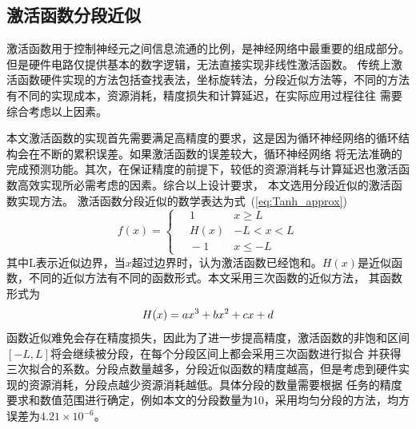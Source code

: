 \subsection{激活函数分段近似}

激活函数用于控制神经元之间信息流通的比例，是神经网络中最重要的组成部分。但是硬件电路仅提供基本的数字逻辑，无法直接实现非线性激活函数。
传统上激活函数硬件实现的方法包括查找表法，坐标旋转法，分段近似方法等，不同的方法有不同的实现成本，资源消耗，精度损失和计算延迟，在实际应用过程往往
需要综合考虑以上因素。

本文激活函数的实现首先需要满足高精度的要求，这是因为循环神经网络的循环结构会在不断的累积误差。如果激活函数的误差较大，循环神经网络
将无法准确的完成预测功能。其次，在保证精度的前提下，较低的资源消耗与计算延迟也激活函数高效实现所必需考虑的因素。综合以上设计要求，
本文选用分段近似的激活函数实现方法。
激活函数分段近似的数学表达为式~(\ref{eq:Tanh_approx})
\begin{equation}
f(x) = 
  \begin{cases} 
  \quad 1			&  x \geq L \\
  \quad H(x)     	&  -L < x < L	\\
  \quad -1			& 	x\leq -L
  \end{cases}
\label{eq:Tanh_approx}
\end{equation}
其中L表示近似边界，当\(x\)超过边界时，认为激活函数已经饱和。\(H(x)\)是近似函数，不同的近似方法有不同的函数形式。本文采用三次函数的近似方法，
其函数形式为
\begin{equation}
H(x) = ax^3 + bx^2 + cx +d	\\
\end{equation}
函数近似难免会存在精度损失，因此为了进一步提高精度，激活函数的非饱和区间\([-L,L]\)将会继续被分段，在每个分段区间上都会采用三次函数进行拟合
并获得三次拟合的系数。分段点数量越多，分段近似函数的精度越高，但是考虑到硬件实现的资源消耗，分段点越少资源消耗越低。具体分段的数量需要根据
任务的精度要求和数值范围进行确定，例如本文的分段数量为10，采用均匀分段的方法，均方误差为\(4.21 \times 10^{-6}\)。
